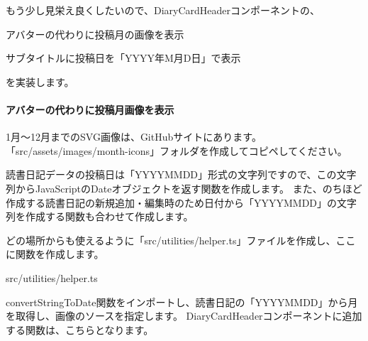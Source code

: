 もう少し見栄え良くしたいので、DiaryCardHeaderコンポーネントの、

\begin{starterenumerate}
\item アバターの代わりに投稿月の画像を表示
\item サブタイトルに投稿日を「YYYY年M月D日」で表示
\end{starterenumerate}

を実装します。

\paragraph*{アバターの代わりに投稿月画像を表示}\vspace*{\baselineskip}

1月〜12月までのSVG画像は、GitHubサイトにあります。「src/assets/images/month{-}icons」フォルダを作成してコピペしてください。

\vspace*{\baselineskip}

読書日記データの投稿日は「YYYYMMDD」形式の文字列ですので、この文字列からJavaScriptのDateオブジェクトを返す関数を作成します。
また、のちほど作成する読書日記の新規追加・編集時のため日付から「YYYYMMDD」の文字列を作成する関数も合わせて作成します。

どの場所からも使えるように「src/utilities/helper.ts」ファイルを作成し、ここに関数を作成します。

\def\startercodeblockfontsize{}
\begin{starterprogram}[]{src/utilities/helper.ts}\end{starterprogram}

convertStringToDate関数をインポートし、読書日記の「YYYYMMDD」から月を取得し、画像のソースを指定します。
DiaryCardHeaderコンポーネントに追加する関数は、こちらとなります。

